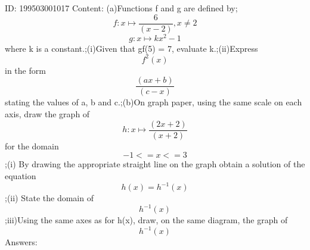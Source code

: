 \documentclass{article}
\begin{document}
ID: 199503001017
Content:
(a)Functions f and g are defined by;\[f:x \mapsto \frac{6}{(x-2)},x\neq 2\] \[g:x \mapsto kx^2-1\] where k is a constant.;(i)Given that gf(5) = 7, evaluate k.;(ii)Express \[f^2(x) \]  in the form \[\frac{(ax+b)}{(c-x)}\] stating the values of a, b and c.;(b)On graph paper, using the same scale on each axis, draw the graph of \[h:x \mapsto \frac{(2x+2)}{(x+2)}\] for the domain \[-1<=x<=3\];(i) By drawing the appropriate straight line on the graph obtain a solution of the equation \[h(x)=h^{-1}(x)\];(ii) State the domain of\[h^{-1}(x)\];iii)Using the same axes as for h(x), draw, on the same diagram, the graph of \[h^{-1}(x)\]Answers:
\end{document}
